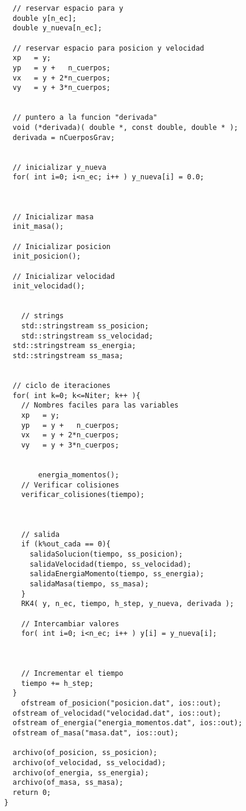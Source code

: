 \begin{lstlisting}
  // reservar espacio para y
  double y[n_ec];
  double y_nueva[n_ec];

  // reservar espacio para posicion y velocidad
  xp   = y;
  yp   = y +   n_cuerpos;
  vx   = y + 2*n_cuerpos;
  vy   = y + 3*n_cuerpos;


  // puntero a la funcion "derivada"
  void (*derivada)( double *, const double, double * );
  derivada = nCuerposGrav;


  // inicializar y_nueva
  for( int i=0; i<n_ec; i++ ) y_nueva[i] = 0.0;



  // Inicializar masa
  init_masa();

  // Inicializar posicion
  init_posicion();

  // Inicializar velocidad
  init_velocidad();


	// strings
	std::stringstream ss_posicion;
	std::stringstream ss_velocidad;
  std::stringstream ss_energia;
  std::stringstream ss_masa;


  // ciclo de iteraciones
  for( int k=0; k<=Niter; k++ ){
    // Nombres faciles para las variables
    xp   = y;
    yp   = y +   n_cuerpos;
    vx   = y + 2*n_cuerpos;
    vy   = y + 3*n_cuerpos;


		energia_momentos();
    // Verificar colisiones
    verificar_colisiones(tiempo);



    // salida
    if (k%out_cada == 0){
      salidaSolucion(tiempo, ss_posicion);
      salidaVelocidad(tiempo, ss_velocidad);
      salidaEnergiaMomento(tiempo, ss_energia);
      salidaMasa(tiempo, ss_masa);
    }
    RK4( y, n_ec, tiempo, h_step, y_nueva, derivada );

    // Intercambiar valores
    for( int i=0; i<n_ec; i++ ) y[i] = y_nueva[i];



    // Incrementar el tiempo
    tiempo += h_step;
  }
	ofstream of_posicion("posicion.dat", ios::out);
  ofstream of_velocidad("velocidad.dat", ios::out);
  ofstream of_energia("energia_momentos.dat", ios::out);
  ofstream of_masa("masa.dat", ios::out);

  archivo(of_posicion, ss_posicion);
  archivo(of_velocidad, ss_velocidad);
  archivo(of_energia, ss_energia);
  archivo(of_masa, ss_masa);
  return 0;
}

\end{lstlisting}

